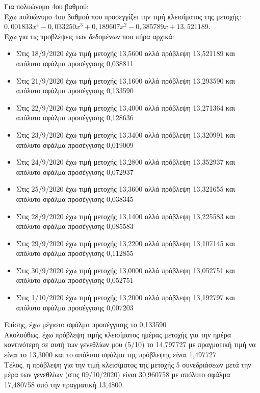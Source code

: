 \documentclass[a4paper,11pt]{article}
\newcommand{\lt}{\latintext}
\begin{document}
\par 
Για πολυώνυμο 4ου βαθμού:\\

Έχω πολυώνυμο 4ου βαθμού που προσεγγίζει την τιμή κλεισίματος της μετοχής: {\lt $0,001833x^4 -0,033250x^3 + 0,189607x^2 -0,385789x + 13,521189$}.\\

Έχω για τις προβλέψεις των δεδομένων που πήρα αρχικά:
\begin{itemize}
	\item Στις 18/9/2020 έχω τιμή μετοχής 13,5600 αλλά πρόβλεψη 13,521189 και απόλυτο σφάλμα προσέγγισης 0,038811
	\item Στις 21/9/2020 έχω τιμή μετοχής 13,1600 αλλά πρόβλεψη 13,293590 και απόλυτο σφάλμα προσέγγισης 0,133590
	\item Στις 22/9/2020 έχω τιμή μετοχής 13,4000 αλλά πρόβλεψη 13,271364 και απόλυτο σφάλμα προσέγγισης 0,128636
	\item Στις 23/9/2020 έχω τιμή μετοχής 13,3400 αλλά πρόβλεψη 13,320991 και απόλυτο σφάλμα προσέγγισης 0,019009
	\item Στις 24/9/2020 έχω τιμή μετοχής 13,2800 αλλά πρόβλεψη 13,352937 και απόλυτο σφάλμα προσέγγισης 0,072937
	\item Στις 25/9/2020 έχω τιμή μετοχής 13,3600 αλλά πρόβλεψη 13,321655 και απόλυτο σφάλμα προσέγγισης 0,038345
    \item Στις 28/9/2020 έχω τιμή μετοχής 13,1400 αλλά πρόβλεψη 13,225583 και απόλυτο σφάλμα προσέγγισης 0,085583
	\item Στις 29/9/2020 έχω τιμή μετοχής 13,2200 αλλά πρόβλεψη 13,107145 και απόλυτο σφάλμα προσέγγισης 0,112855
	\item Στις 30/9/2020 έχω τιμή μετοχής 13,0000 αλλά πρόβλεψη 13,052751 και απόλυτο σφάλμα προσέγγισης 0,052751
	\item Στις 1/10/2020 έχω τιμή μετοχής 13,2000 αλλά πρόβλεψη 13,192797 και απόλυτο σφάλμα προσέγγισης 0,007203
	\end{itemize}
Επίσης, έχω μέγιστο σφάλμα προσέγγισης το 0,133590\\

Ακολούθως, έχω πρόβλεψη τιμής κλεισίματος ημέρας μετοχής για την ημέρα κοντινότερη σε αυτή των γενεθλίων μου (5/10) το 14,797727 με πραγματική τιμή να είναι το 13,3000 και το απόλυτο σφάλμα της πρόβλεψης είναι 1,497727\\

Τέλος, η πρόβλεψη για την τιμή κλεισίματος της μετοχής 5 συνεδριάσεων μετά την μέρα των γενεθλίων (στις 09/10/2020) είναι 30,960758 με απόλυτο σφάλμα 17,480758 από την πραγματική 13,4800.\\
\end{document}
